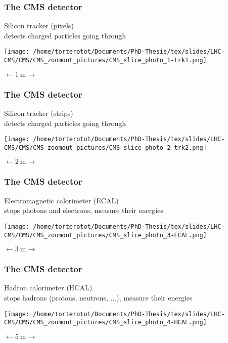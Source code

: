 \begin{frame}
\frametitle{The CMS detector}\pause
\begin{center}
Silicon tracker (pixels)\\
detects charged particles going through

\texttt{[image: /home/torterotot/Documents/PhD-Thesis/tex/slides/LHC-CMS/CMS/CMS\_zoomout\_pictures/CMS\_slice\_photo\_1-trk1.png]}

$\longleftarrow \SI{1}{\meter} \longrightarrow$
\end{center}
\end{frame}
\begin{frame}\addtocounter{framenumber}{-1}
\frametitle{The CMS detector}
\begin{center}
Silicon tracker (strips)\\
detects charged particles going through

\texttt{[image: /home/torterotot/Documents/PhD-Thesis/tex/slides/LHC-CMS/CMS/CMS\_zoomout\_pictures/CMS\_slice\_photo\_2-trk2.png]}

$\longleftarrow \SI{2}{\meter} \longrightarrow$
\end{center}
\end{frame}
\begin{frame}\addtocounter{framenumber}{-1}
\frametitle{The CMS detector}
\begin{center}
Electromagnetic calorimeter (ECAL)\\
stops photons and electrons, measure their energies

\texttt{[image: /home/torterotot/Documents/PhD-Thesis/tex/slides/LHC-CMS/CMS/CMS\_zoomout\_pictures/CMS\_slice\_photo\_3-ECAL.png]}

$\longleftarrow \SI{3}{\meter} \longrightarrow$
\end{center}
\end{frame}
\begin{frame}\addtocounter{framenumber}{-1}
\frametitle{The CMS detector}
\begin{center}
Hadron calorimeter (HCAL)\\
stops hadrons (protons, neutrons, ...), measure their energies

\texttt{[image: /home/torterotot/Documents/PhD-Thesis/tex/slides/LHC-CMS/CMS/CMS\_zoomout\_pictures/CMS\_slice\_photo\_4-HCAL.png]}

$\longleftarrow \SI{5}{\meter} \longrightarrow$
\end{center}
\end{frame}
